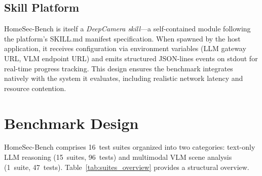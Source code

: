 \documentclass[conference]{IEEEtran}
\begin{document}
\subsection{Skill Platform}
HomeSec-Bench is itself a \emph{DeepCamera skill}---a self-contained
module following the platform's SKILL.md manifest specification. When
spawned by the host application, it receives configuration via
environment variables (LLM gateway URL, VLM endpoint URL) and emits
structured JSON-lines events on stdout for real-time progress tracking.
This design ensures the benchmark integrates natively with the system
it evaluates, including realistic network latency and resource
contention.


\section{Benchmark Design}

HomeSec-Bench comprises 16~test suites organized into two categories:
text-only LLM reasoning (15~suites, 96~tests) and multimodal VLM scene
analysis (1~suite, 47~tests). Table~\ref{tab:suites_overview} provides
a structural overview.
\end{document}
